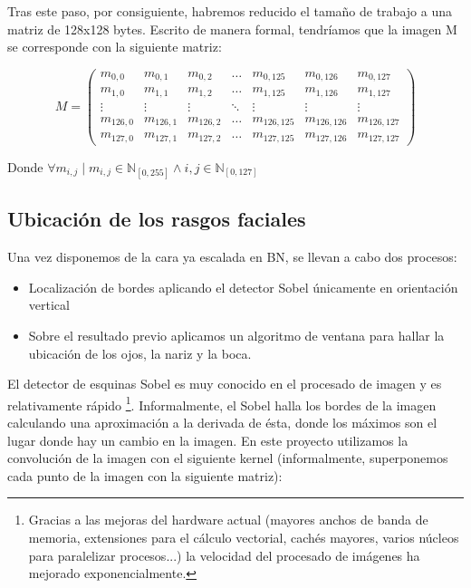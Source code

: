 Tras este paso, por consiguiente, habremos reducido el tamaño de trabajo a una matriz de 128x128 bytes. Escrito de manera formal, tendríamos que la imagen M se corresponde con la siguiente matriz:

\[ M=\left( \begin{array}{lcccccr} 
	m_{0,0} & m_{0,1} & m_{0,2} & \hdots & m_{0,125} & m_{0,126} & m_{0,127}\\
	m_{1,0} & m_{1,1} & m_{1,2} & \hdots & m_{1,125} & m_{1,126} & m_{1,127}\\
	\vdots & \vdots & \vdots & \ddots & \vdots & \vdots & \vdots \\
	m_{126,0} & m_{126,1} & m_{126,2} & \hdots & m_{126,125} & m_{126,126} & m_{126,127}\\
	m_{127,0} & m_{127,1} & m_{127,2} & \hdots & m_{127,125} & m_{127,126} & m_{127,127}
	\end{array} \right)
\]

Donde $ \forall m_{i,j} \mid m_{i,j} \in \mathbb{N}_{\left[ 0,255 \right]} \wedge i,j \in \mathbb{N}_{\left[ 0,127 \right]} $
	

\subsection{Ubicación de los rasgos faciales}
Una vez disponemos de la cara ya escalada en BN, se llevan a cabo dos procesos:
\begin{itemize}
	\item{Localización de bordes aplicando el detector Sobel únicamente en orientación vertical}
	\item{Sobre el resultado previo aplicamos un algoritmo de ventana para hallar la ubicación de los ojos, la nariz y la boca.}
\end{itemize}

El detector de esquinas Sobel es muy conocido en el procesado de imagen y es relativamente rápido \footnote{Gracias a las mejoras del hardware actual (mayores anchos de banda de memoria, extensiones para el cálculo vectorial, cachés mayores, varios núcleos para paralelizar procesos...) la velocidad del procesado de imágenes ha mejorado exponencialmente. }. Informalmente, el Sobel halla los bordes de la imagen calculando una aproximación a la derivada de ésta, donde los máximos son el lugar donde hay un cambio en la imagen. En este proyecto utilizamos la convolución de la imagen con el siguiente kernel (informalmente, superponemos cada punto de la imagen con la siguiente matriz):

